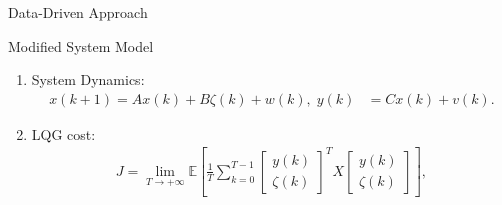 \documentclass[10pt]{beamer}
\newcommand{\tikzdir}[1]{#1.tikz}
\newcommand{\inputtikz}[1]{}}
\begin{document}
\begin{frame}{Data-Driven Approach}
  \begin{figure}[htpb]
    \inputtikz{systemdiagram2}
  \end{figure}
\end{frame}

\begin{frame}{Modified System Model}
  \begin{figure}
    \centering
  \end{figure}
  \begin{enumerate}
    \item System Dynamics:
      \begin{align*}
	x(k+1) = A x(k) + B\zeta(k)+w(k), \;y(k)  &= C x(k) + v(k) . 
      \end{align*}
    \item LQG cost:
      \begin{align*}
	J = \lim_{T \to +\infty} \mathbb E\left [\frac{1}{T}\sum_{k=0}^{T-1} \begin{bmatrix}
	    y(k)\\
	    \zeta(k)
	    \end{bmatrix}^TX \begin{bmatrix}
	    y(k)\\
	    \zeta(k)
	\end{bmatrix} \right ],
      \end{align*}
  \end{enumerate}
\end{frame}
\end{document}

